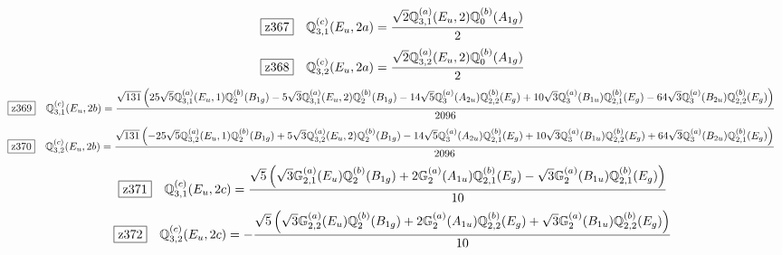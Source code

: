 \documentclass[fleqn,10pt,landscape]{jsarticle}
\begin{document}
\begin{dmath*}
\hspace*{3mm}\fbox{z367}\quad \mathbb{Q}_{3,1}^{(c)}(E_{u},2a)=\frac{\sqrt{2} \mathbb{Q}_{3,1}^{(a)}(E_{u},2) \mathbb{Q}_{0}^{(b)}(A_{1g})}{2}
\end{dmath*}
\begin{dmath*}
\hspace*{3mm}\fbox{z368}\quad \mathbb{Q}_{3,2}^{(c)}(E_{u},2a)=\frac{\sqrt{2} \mathbb{Q}_{3,2}^{(a)}(E_{u},2) \mathbb{Q}_{0}^{(b)}(A_{1g})}{2}
\end{dmath*}
\begin{dmath*}
\hspace*{3mm}\fbox{z369}\quad \mathbb{Q}_{3,1}^{(c)}(E_{u},2b)=\frac{\sqrt{131} \left(25 \sqrt{5} \mathbb{Q}_{3,1}^{(a)}(E_{u},1) \mathbb{Q}_{2}^{(b)}(B_{1g}) - 5 \sqrt{3} \mathbb{Q}_{3,1}^{(a)}(E_{u},2) \mathbb{Q}_{2}^{(b)}(B_{1g}) - 14 \sqrt{5} \mathbb{Q}_{3}^{(a)}(A_{2u}) \mathbb{Q}_{2,2}^{(b)}(E_{g}) + 10 \sqrt{3} \mathbb{Q}_{3}^{(a)}(B_{1u}) \mathbb{Q}_{2,1}^{(b)}(E_{g}) - 64 \sqrt{3} \mathbb{Q}_{3}^{(a)}(B_{2u}) \mathbb{Q}_{2,2}^{(b)}(E_{g})\right)}{2096}
\end{dmath*}
\begin{dmath*}
\hspace*{3mm}\fbox{z370}\quad \mathbb{Q}_{3,2}^{(c)}(E_{u},2b)=\frac{\sqrt{131} \left(- 25 \sqrt{5} \mathbb{Q}_{3,2}^{(a)}(E_{u},1) \mathbb{Q}_{2}^{(b)}(B_{1g}) + 5 \sqrt{3} \mathbb{Q}_{3,2}^{(a)}(E_{u},2) \mathbb{Q}_{2}^{(b)}(B_{1g}) - 14 \sqrt{5} \mathbb{Q}_{3}^{(a)}(A_{2u}) \mathbb{Q}_{2,1}^{(b)}(E_{g}) + 10 \sqrt{3} \mathbb{Q}_{3}^{(a)}(B_{1u}) \mathbb{Q}_{2,2}^{(b)}(E_{g}) + 64 \sqrt{3} \mathbb{Q}_{3}^{(a)}(B_{2u}) \mathbb{Q}_{2,1}^{(b)}(E_{g})\right)}{2096}
\end{dmath*}
\begin{dmath*}
\hspace*{3mm}\fbox{z371}\quad \mathbb{Q}_{3,1}^{(c)}(E_{u},2c)=\frac{\sqrt{5} \left(\sqrt{3} \mathbb{G}_{2,1}^{(a)}(E_{u}) \mathbb{Q}_{2}^{(b)}(B_{1g}) + 2 \mathbb{G}_{2}^{(a)}(A_{1u}) \mathbb{Q}_{2,1}^{(b)}(E_{g}) - \sqrt{3} \mathbb{G}_{2}^{(a)}(B_{1u}) \mathbb{Q}_{2,1}^{(b)}(E_{g})\right)}{10}
\end{dmath*}
\begin{dmath*}
\hspace*{3mm}\fbox{z372}\quad \mathbb{Q}_{3,2}^{(c)}(E_{u},2c)=- \frac{\sqrt{5} \left(\sqrt{3} \mathbb{G}_{2,2}^{(a)}(E_{u}) \mathbb{Q}_{2}^{(b)}(B_{1g}) + 2 \mathbb{G}_{2}^{(a)}(A_{1u}) \mathbb{Q}_{2,2}^{(b)}(E_{g}) + \sqrt{3} \mathbb{G}_{2}^{(a)}(B_{1u}) \mathbb{Q}_{2,2}^{(b)}(E_{g})\right)}{10}
\end{dmath*}
\end{document}

